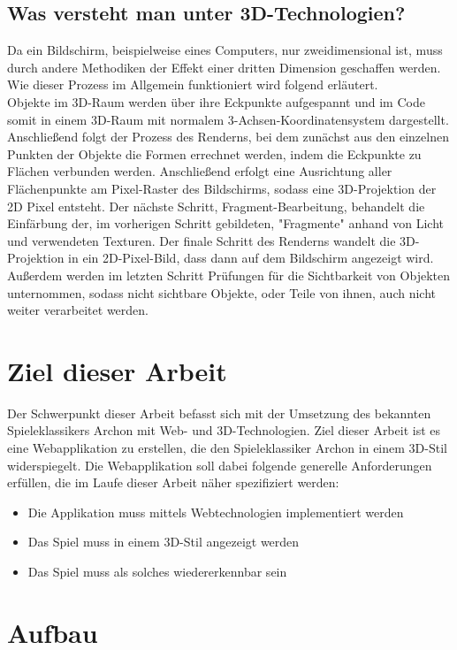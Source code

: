 \subsection{Was versteht man unter 3D-Technologien?}
Da ein Bildschirm, beispielweise eines Computers, nur zweidimensional ist, muss durch andere Methodiken der Effekt einer dritten Dimension geschaffen werden. Wie dieser Prozess im Allgemein funktioniert wird folgend erläutert.\\Objekte im 3D-Raum werden über ihre Eckpunkte aufgespannt und im Code somit in einem 3D-Raum mit normalem 3-Achsen-Koordinatensystem dargestellt. Anschließend folgt der Prozess des Renderns, bei dem zunächst aus den einzelnen Punkten der Objekte die Formen errechnet werden, indem die Eckpunkte zu Flächen verbunden werden. Anschließend erfolgt eine Ausrichtung aller Flächenpunkte am Pixel-Raster des Bildschirms, sodass eine 3D-Projektion der 2D Pixel entsteht. Der nächste Schritt, Fragment-Bearbeitung, behandelt die Einfärbung der, im vorherigen Schritt gebildeten, "Fragmente" anhand von Licht und verwendeten Texturen. Der finale Schritt des Renderns wandelt die 3D-Projektion in ein 2D-Pixel-Bild, dass dann auf dem Bildschirm angezeigt wird. Außerdem werden im letzten Schritt Prüfungen für die Sichtbarkeit von Objekten unternommen, sodass nicht sichtbare Objekte, oder Teile von ihnen, auch nicht weiter verarbeitet werden.

\section{Ziel dieser Arbeit}
\label{sec:ziel_dieser_arbeit}
Der Schwerpunkt dieser Arbeit befasst sich mit der Umsetzung des bekannten Spieleklassikers Archon mit Web- und 3D-Technologien.
Ziel dieser Arbeit ist es eine Webapplikation zu erstellen, die den Spieleklassiker Archon in einem 3D-Stil widerspiegelt.
Die Webapplikation soll dabei folgende generelle Anforderungen erfüllen, die im Laufe dieser Arbeit näher spezifiziert werden:
\begin{itemize}
	\item Die Applikation muss mittels Webtechnologien implementiert werden
	\item Das Spiel muss in einem 3D-Stil angezeigt werden
	\item Das Spiel muss als solches wiedererkennbar sein
\end{itemize}
\section{Aufbau}
\label{sec:aufbau}

